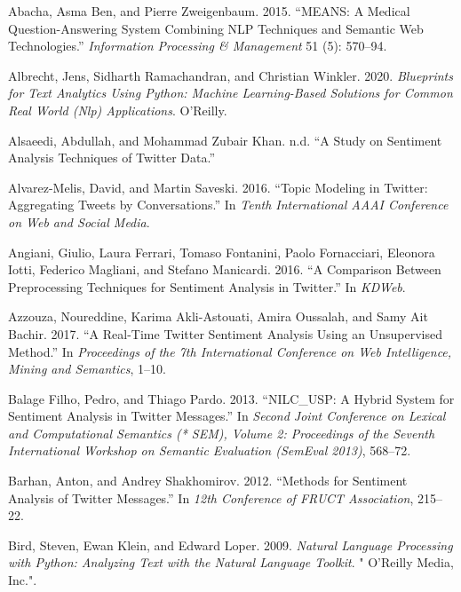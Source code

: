 \documentclass[
]{article}
\newlength{\cslhangindent}
\newlength{\cslentryspacingunit} %
\newenvironment{CSLReferences}[2] %
 {%
  \setlength{\parindent}{0pt}
  \ifodd #1
  \let\oldpar\par
  \def\par{\hangindent=\cslhangindent\oldpar}
  \fi
  \setlength{\parskip}{#2\cslentryspacingunit}
 }%
 {}
\begin{document}
\hypertarget{refs}{}
\begin{CSLReferences}{1}{0}
\leavevmode{}%
Abacha, Asma Ben, and Pierre Zweigenbaum. 2015. {``MEANS: A Medical
Question-Answering System Combining NLP Techniques and Semantic Web
Technologies.''} \emph{Information Processing \& Management} 51 (5):
570--94.

\leavevmode{}%
Albrecht, Jens, Sidharth Ramachandran, and Christian Winkler. 2020.
\emph{Blueprints for Text Analytics Using Python: Machine Learning-Based
Solutions for Common Real World (Nlp) Applications}. O'Reilly.

\leavevmode{}%
Alsaeedi, Abdullah, and Mohammad Zubair Khan. n.d. {``A Study on
Sentiment Analysis Techniques of Twitter Data.''}

\leavevmode{}%
Alvarez-Melis, David, and Martin Saveski. 2016. {``Topic Modeling in
Twitter: Aggregating Tweets by Conversations.''} In \emph{Tenth
International AAAI Conference on Web and Social Media}.

\leavevmode{}%
Angiani, Giulio, Laura Ferrari, Tomaso Fontanini, Paolo Fornacciari,
Eleonora Iotti, Federico Magliani, and Stefano Manicardi. 2016. {``A
Comparison Between Preprocessing Techniques for Sentiment Analysis in
Twitter.''} In \emph{KDWeb}.

\leavevmode{}%
Azzouza, Noureddine, Karima Akli-Astouati, Amira Oussalah, and Samy Ait
Bachir. 2017. {``A Real-Time Twitter Sentiment Analysis Using an
Unsupervised Method.''} In \emph{Proceedings of the 7th International
Conference on Web Intelligence, Mining and Semantics}, 1--10.

\leavevmode{}%
Balage Filho, Pedro, and Thiago Pardo. 2013. {``NILC\_USP: A Hybrid
System for Sentiment Analysis in Twitter Messages.''} In \emph{Second
Joint Conference on Lexical and Computational Semantics (* SEM), Volume
2: Proceedings of the Seventh International Workshop on Semantic
Evaluation (SemEval 2013)}, 568--72.

\leavevmode{}%
Barhan, Anton, and Andrey Shakhomirov. 2012. {``Methods for Sentiment
Analysis of Twitter Messages.''} In \emph{12th Conference of FRUCT
Association}, 215--22.

\leavevmode{}%
Bird, Steven, Ewan Klein, and Edward Loper. 2009. \emph{Natural Language
Processing with Python: Analyzing Text with the Natural Language
Toolkit}. " O'Reilly Media, Inc.".


\end{CSLReferences}
\end{document}
